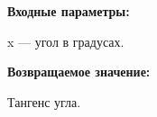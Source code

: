 \textbf{Входные параметры:}

 x --- угол в градусах.

\textbf{Возвращаемое значение:}

Тангенс угла.